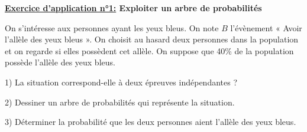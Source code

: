 \documentclass[12pt]{article}
\begin{document}
\begin{mdframed}[
    linewidth=1pt,
    roundcorner=5pt,
    linecolor=RoyalBlue,
    innertopmargin=10pt,
    innerbottommargin=10pt
]
{\color{RoyalBlue}
\textbf{\underline{Exercice d'application n°1:} Exploiter un arbre de probabilités}}

\vspace{5pt}
On s'intéresse aux personnes ayant les yeux bleus. On note $B$ l'évènement « Avoir l'allèle des yeux 
bleus ». On choisit au hasard deux personnes dans la population et on regarde si elles possèdent cet allèle. 
On suppose que 40\% de la population possède l'allèle des yeux bleus.

\vspace{5pt}
\hspace{1cm}1) La situation correspond-elle à deux épreuves indépendantes ?

\vspace{5pt}
\hspace{1cm}2) Dessiner un arbre de probabilités qui représente la situation.

\vspace{5pt}
\hspace{1cm}3) Déterminer la probabilité que les deux personnes aient l'allèle des yeux bleus.

\begin{minipage}[t]{.55\textwidth}%
    \vspace{0pt}
    \vspace{0.5cm}
    {\color{black!40}\dotfill}

    \vspace{0.5cm}
    {\color{black!40}\dotfill}

    \vspace{0.5cm}
    {\color{black!40}\dotfill}

    \vspace{0.5cm}
    {\color{black!40}\dotfill}

    \vspace{0.5cm}
    {\color{black!40}\dotfill}

    \vspace{0.5cm}
    {\color{black!40}\dotfill}

    \vspace{0.5cm}
    {\color{black!40}\dotfill}
    

    \vspace{20pt}
\end{minipage}%
\hfill
\begin{minipage}[t]{.45\textwidth}%
    \vspace{0pt}
    
\end{minipage}%

\end{mdframed}
\end{document}

